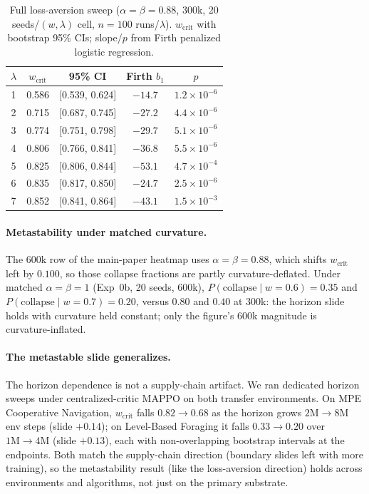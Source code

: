 \documentclass[letterpaper]{article} %
\theoremstyle{plain}
\newcommand{\wcrit}{w_{\mathrm{crit}}}
\begin{document}
\begin{table}[t]
\centering
\caption{Full loss-aversion sweep ($\alpha{=}\beta{=}0.88$, 300k, 20 seeds/$(w,\lambda)$
cell, $n{=}100$ runs/$\lambda$). $\wcrit$ with bootstrap 95\% CIs; slope/$p$ from Firth
penalized logistic regression.}
\label{tab:lambda_sweep}
\small
\begin{tabular}{ccccc}
\toprule
$\lambda$ & $\wcrit$ & 95\% CI & Firth $b_1$ & $p$ \\
\midrule
1 & 0.586 & [0.539, 0.624] & $-14.7$ & $1.2\times10^{-6}$ \\
2 & 0.715 & [0.687, 0.745] & $-27.2$ & $4.4\times10^{-6}$ \\
3 & 0.774 & [0.751, 0.798] & $-29.7$ & $5.1\times10^{-6}$ \\
4 & 0.806 & [0.766, 0.841] & $-36.8$ & $5.5\times10^{-6}$ \\
5 & 0.825 & [0.806, 0.844] & $-53.1$ & $4.7\times10^{-4}$ \\
6 & 0.835 & [0.817, 0.850] & $-24.7$ & $2.5\times10^{-6}$ \\
7 & 0.852 & [0.841, 0.864] & $-43.1$ & $1.5\times10^{-3}$ \\
\bottomrule
\end{tabular}
\end{table}

\paragraph{Metastability under matched curvature.}
The 600k row of the main-paper heatmap uses $\alpha{=}\beta{=}0.88$, which shifts $\wcrit$
left by $0.100$, so those collapse fractions are partly curvature-deflated. Under matched
$\alpha{=}\beta{=}1$ (Exp~0b, 20 seeds, 600k), $P(\mathrm{collapse}\mid w{=}0.6)=0.35$ and
$P(\mathrm{collapse}\mid w{=}0.7)=0.20$, versus $0.80$ and $0.40$ at 300k: the horizon slide
holds with curvature held constant; only the figure's 600k magnitude is curvature-inflated.

\paragraph{The metastable slide generalizes.}
The horizon dependence is not a supply-chain artifact. We ran dedicated horizon sweeps under
centralized-critic MAPPO on both transfer environments. On MPE Cooperative Navigation,
$\wcrit$ falls $0.82\to0.68$ as the horizon grows $2\mathrm{M}\to8\mathrm{M}$ env steps (slide
$+0.14$); on Level-Based Foraging it falls $0.33\to0.20$ over $1\mathrm{M}\to4\mathrm{M}$
(slide $+0.13$), each with non-overlapping bootstrap intervals at the endpoints. Both match
the supply-chain direction (boundary slides left with more training), so the metastability
result (like the loss-aversion direction) holds across environments and algorithms, not just
on the primary substrate.
\end{document}
